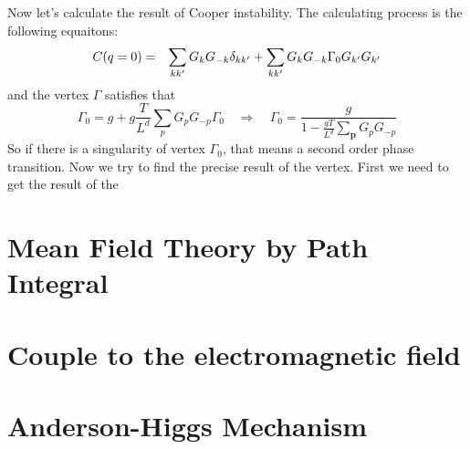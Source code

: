 \documentclass{article}
\newcommand{\mtp}{\mathbf{p}}
\begin{document}
Now let's calculate the result of Cooper instability. The calculating process is the following equaitons:
\begin{eqnarray}
C(q=0) &=&\sum_{kk'} G_k G_{-k}\delta_{kk'} + \sum_{kk'}G_{k}G_{-k}\Gamma_0 G_{k'}G_{\-k'}
\end{eqnarray}
and the vertex $\Gamma$ satisfies that
$$
\Gamma_0 = g + g\frac{T}{L^d}\sum_{p}G_{p}G_{-p}\Gamma_0 \quad\Rightarrow\quad \Gamma_0 = \frac{g}{1-\frac{gT}{L^d}\sum_{\mtp}G_p G_{-p}}
$$
So if there is a singularity of vertex $\Gamma_0$, that means a second order phase transition. Now we try to find the precise result of the vertex. First we need to get the result of the 

\section{Mean Field Theory by Path Integral}

\section{Couple to the electromagnetic field}

\section{Anderson-Higgs Mechanism}
\end{document}
